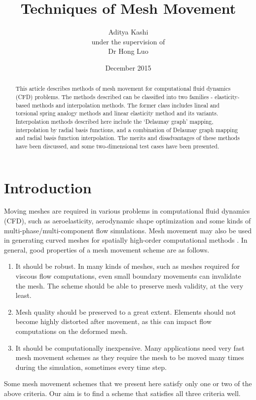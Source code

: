 \documentclass[letterpaper,11pt]{article}
\title{Techniques of Mesh Movement}
\author{Aditya Kashi \\ {\small under the supervision of} \\ Dr Hong Luo}
\date{December 2015}
\begin{document}
\maketitle

\begin{abstract}
This article describes methods of mesh movement for computational fluid dynamics (CFD) problems. The methods described can be classified into two families - elasticity-based methods and interpolation methods. The former class includes lineal and torsional spring analogy methods and linear elasticity method and its variants. Interpolation methods described here include the `Delaunay graph' mapping, interpolation by radial basis functions, and a combination of Delaunay graph mapping and radial basis function interpolation. The merits and disadvantages of these methods have been discussed, and some two-dimensional test cases have been presented.
\end{abstract}
\tableofcontents

\section{Introduction}

Moving meshes are required in various problems in computational fluid dynamics (CFD), such as aeroelasticity, aerodynamic shape optimization \cite{appl:opt} and some kinds of multi-phase/multi-component flow simulations. Mesh movement may also be used in generating curved meshes for spatially high-order computational methods \cite{curve:persson}. In general, good properties of a mesh movement scheme are as follows.
\begin{enumerate}
\item It should be robust. In many kinds of meshes, such as meshes required for viscous flow computations, even small boundary movements can invalidate the mesh. The scheme should be able to preserve mesh validity, at the very least.
\item Mesh quality should be preserved to a great extent. Elements should not become highly distorted after movement, as this can impact flow computations on the deformed mesh.
\item It should be computationally inexpensive. Many applications need very fast mesh movement schemes as they require the mesh to be moved many times during the simulation, sometimes every time step.
\end{enumerate}
Some mesh movement schemes that we present here satisfy only one or two of the above criteria. Our aim is to find a scheme that satisfies all three criteria well.
\end{document}
